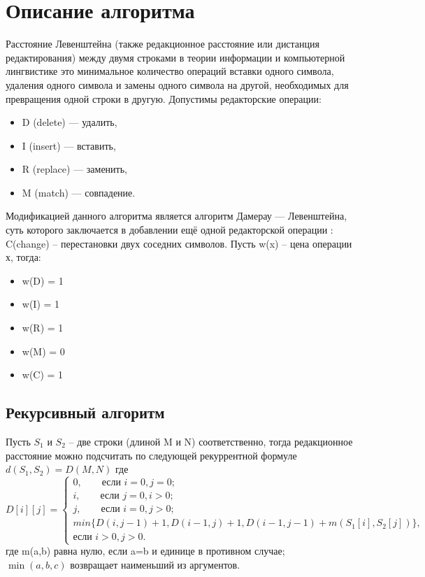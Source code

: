 \documentclass[a4paper,12pt]{article}
\begin{document}
\section{Описание алгоритма}
    Расстояние Левенштейна (также редакционное расстояние или дистанция редактирования) между двумя строками в теории информации и компьютерной лингвистике это минимальное количество операций вставки одного символа, удаления одного символа и замены одного символа на другой, необходимых для превращения одной строки в другую.
    Допустимы редакторские операции:
    \begin{itemize}
      \item D (delete) — удалить,
      \item I (insert) — вставить,
      \item R (replace) — заменить,
      \item M (match) — совпадение.
    \end{itemize}
    Модификацией данного алгоритма является алгоритм Дамерау — Левенштейна, суть которого заключается в добавлении ещё одной редакторской операции : C(change) – перестановки двух соседних символов.
    Пусть w(x) – цена операции х, тогда:
    \begin{itemize}
      \item w(D) = 1
      \item w(I) = 1
      \item w(R) = 1
      \item w(M) = 0
      \item w(C) = 1
    \end{itemize}

    \subsection{Рекурсивный алгоритм}
        Пусть $S_1$ и $S_2$ – две строки (длиной M и N) соответственно, тогда редакционное расстояние можно подсчитать по следующей рекуррентной формуле $d(S_1,S_2)=D(M,N)$ где
        \begin{equation*}
            D[i][j] =
            \begin{cases}
                0, \qquad \text{если $i=0, j=0$;}\\
                i, \qquad \text{если $j=0,i>0$;}\\
                j, \qquad \text{если $i=0,j>0$;}\\
                min\{D(i,j-1)+1,D(i-1,j)+1,D(i-1,j-1)+m(S_1 [i],S_2 [j])\},\\ \text{если $i>0,j>0$.}
            \end{cases}
        \end{equation*}
        где m(a,b) равна нулю, если a=b и единице в противном случае;\\
        $\min(a,b,c)$ возвращает наименьший из аргументов.
\end{document}
